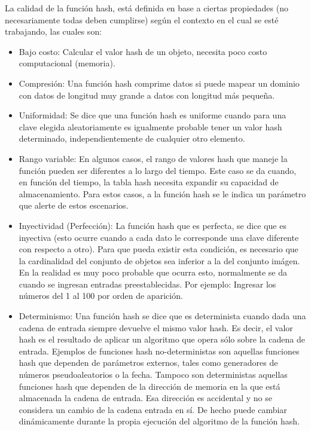 \documentclass[letterpaper,openright,12pt]{report}
\begin{document}
La calidad de la función hash, está definida en base a ciertas propiedades (no necesariamente todas deben cumplirse) según el contexto en el cual se esté trabajando, las cuales son:
\begin{itemize}
\itemsep1pt\parskip0pt
\item
  Bajo costo: Calcular el valor hash de un objeto, necesita poco costo computacional (memoria).
\item
  Compresión: Una función hash comprime datos si puede mapear un dominio con datos de longitud muy grande a datos con longitud más pequeña.
\item
  Uniformidad: Se dice que una función hash es uniforme cuando para una clave elegida aleatoriamente es igualmente probable tener un valor hash determinado, independientemente de cualquier otro elemento.
\newpage
\item
  Rango variable: En algunos casos, el rango de valores hash que maneje la función pueden ser diferentes a lo largo del tiempo. Este caso se da cuando, en función del tiempo, la tabla hash necesita expandir su capacidad de almacenamiento. Para estos casos, a la función hash se le indica un parámetro que alerte de estos escenarios.
\item
  Inyectividad (Perfección): La función hash que es perfecta, se dice que es inyectiva (esto ocurre cuando a cada dato le corresponde una clave diferente con respecto a otro). Para que pueda existir esta condición, es necesario que la cardinalidad del conjunto de objetos sea inferior a la del conjunto imágen. En la realidad es muy poco probable que ocurra esto, normalmente se da cuando se ingresan entradas preestablecidas. Por ejemplo: Ingresar los números del 1 al 100 por orden de aparición.
\item
  Determinismo: Una función hash se dice que es determinista cuando dada una cadena de entrada siempre devuelve el mismo valor hash. Es decir, el valor hash es el resultado de aplicar un algoritmo que opera sólo sobre la cadena de entrada. Ejemplos de funciones hash no-deterministas son aquellas funciones hash que dependen de parámetros externos, tales como generadores de números pseudoaleatorios o la fecha. Tampoco son deterministas aquellas funciones hash que dependen de la dirección de memoria en la que está almacenada la cadena de entrada. Esa dirección es accidental y no se considera un cambio de la cadena entrada en sí. De hecho puede cambiar dinámicamente durante la propia ejecución del algoritmo de la función hash.
\end{itemize}
\newpage
\end{document}
